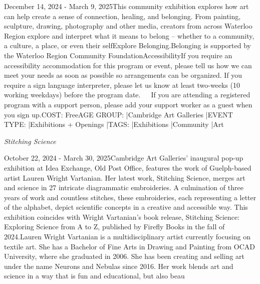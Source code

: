 \documentclass[letterpaper, 10pt]{article}
\newcommand{\subtitle}[1]{\textit{\large #1}\vspace{0.5em}}
\newcommand{\articlecontent}[1]{\small #1\vspace{1em}}
\begin{document}
\begin{multicols}{2}
{
\vspace{10px}

December 14, 2024 - March 9, 2025This community exhibition explores how art can help create a sense of connection, healing, and belonging. From painting, sculpture, drawing, photography and other media, creators from across Waterloo Region explore and interpret what it means to belong – whether to a community, a culture, a place, or even their selfExplore Belonging.Belonging is supported by the Waterloo Region Community FoundationAccessibilityIf you require an accessibility accommodation for this program or event, please tell us how we can meet your needs as soon as possible so arrangements can be organized. If you require a sign language interpreter, please let us know at least two-weeks (10 working weekdays) before the program date.   If you are attending a registered program with a support person, please add your support worker as a guest when you sign up.COST: FreeAGE GROUP: |Cambridge Art Galleries |EVENT TYPE: |Exhibitions + Openings |TAGS: |Exhibitions |Community |Art
}
\vspace{10px}

\subtitle{Stitching Science}

\articlecontent{

\qrcode[height=1.5cm]{https://ideaexchange.libnet.info/event/12111054}
\vspace{10px}

October 22, 2024 - March 30, 2025Cambridge Art Galleries' inaugural pop-up exhibition at Idea Exchange, Old Post Office, features the work of Guelph-based artist Lauren Wright Vartanian. Her latest work, Stitching Science, merges art and science in 27 intricate diagrammatic embroideries. A culmination of three years of work and countless stitches, these embroideries, each representing a letter of the alphabet, depict scientific concepts in a creative and accessible way. This exhibition coincides with Wright Vartanian’s book release, Stitching Science: Exploring Science from A to Z, published by Firefly Books in the fall of 2024.Lauren Wright Vartanian is a multidisciplinary artist currently focusing on textile art. She has a Bachelor of Fine Arts in Drawing and Painting from OCAD University, where she graduated in 2006. She has been creating and selling art under the name Neurons and Nebulas since 2016. Her work blends art and science in a way that is fun and educational, but also beau
}
\vspace{10px}


\end{multicols}
\end{document}
